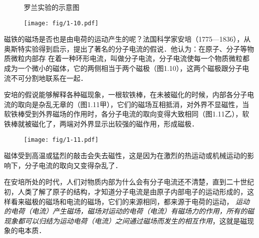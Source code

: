 \begin{figure}[htp]\centering
	\begin{minipage}[t]{0.48\textwidth}
		\centering
{}
		\caption{罗兰实验的示意图}
	\end{minipage}
	\begin{minipage}[t]{0.48\textwidth}
		\centering
		\texttt{[image: fig/1-10.pdf]}
		\caption{}
	\end{minipage}
\end{figure}


磁铁的磁场是否也是由电荷的运动产生的呢？法国科学家安培（1775—1836），从奥斯特实验得到启示，提出了著名的分子电流的假说．他认为：在原子、分子等物质微粒内部存
在着一种环形电流，叫做分子电流，分子电流使每一个物质微粒都成为一个微小的磁体，它的两侧相当于两个磁极（图1.10），这两个磁极跟分子电流不可分割地联系在一起．


安培的假说能够解释各种磁现象，一根软铁棒，在未被磁化的时候，内部各分子电流的取向是杂乱无章的（图1.11甲），它们的磁场互相抵消，对外界不显磁性，当软铁棒受到外界磁场的作用时，各分子电流的取向变得大致相同（图1.11乙），软铁棒就被磁化了，两端对外界显示出较强的磁作用，形成磁极．

\begin{figure}[htp]\centering
\texttt{[image: fig/1-11.pdf]}
\caption{}
\end{figure}

磁体受到高温或猛烈的敲击会失去磁性，这是因为在激烈的热运动或机械运动的影响下，分子电流的取向又变得杂乱了．

在安培所处的时代，人们对物质内部为什么会有分子电流还不清楚，直到二十世纪初，人类了解了原子的结构，才知道分子电流是由原子内部电子的运动形成的，这样看来磁极的磁场和电流的磁场，它们的来源相同，都来源于电荷的运动，
\textit{运动的电荷（电流）产生磁场，磁场对运动的电荷（电流）有磁场力的作用，所有的磁现象都可以归结为运动电荷（电流）之间通过磁场而发生的相互作用}，这就是磁现象的电本质．

